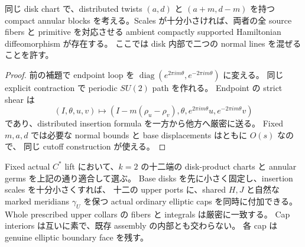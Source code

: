 \begin{corollary}
\label{kc:redistribution}
同じ disk chart で、distributed twists $(a,d)$ と $(a+m,d-m)$ を持つ compact annular
blocks を考える。Scales が十分小さければ、両者の全 source fibers と primitive を対応させる
ambient compactly supported Hamiltonian diffeomorphism が存在する。
ここでは disk 内部で二つの normal lines を混ぜることを許す。
\end{corollary}

\begin{proof}
前の補題で endpoint loop を
$\operatorname{diag}(e^{2\pi im\theta},e^{-2\pi im\theta})$ に変える。
同じ explicit contraction で periodic $SU(2)$ path を作れる。
Endpoint の strict shear は
\[
 (I,\theta,u,v)\longmapsto
 (I-m(\rho_u-\rho_v),\theta,e^{2\pi im\theta}u,e^{-2\pi im\theta}v)
\]
であり、distributed insertion formula を一方から他方へ厳密に送る。
Fixed $m,a,d$ では必要な normal bounds と base displacements はともに $O(s)$ なので、
同じ cutoff construction が使える。
\end{proof}

\begin{theorem}
\label{kc:twelve-caps}
Fixed actual $C^*$ lift において、$k=2$ の十二端の disk-product charts と
annular germs を上記の通り適合して選ぶ。
Base disks を先に小さく固定し、insertion scales を十分小さくすれば、
十二の upper ports に、shared $H,J$ と自然な marked meridians $\gamma_U$ を保つ
actual ordinary elliptic caps を同時に付加できる。
Whole prescribed upper collars の fibers と integrals は厳密に一致する。
Cap interiors は互いに素で、既存 assembly の内部とも交わらない。
各 cap は genuine elliptic boundary face を残す。
\end{theorem}

